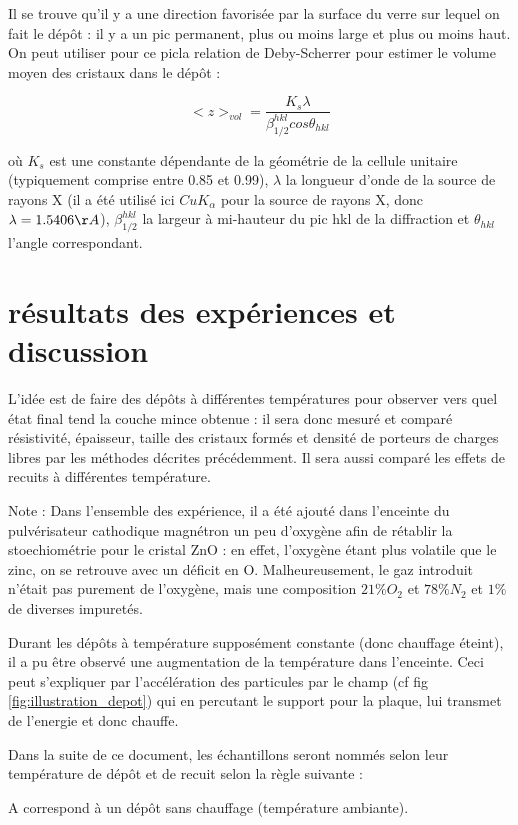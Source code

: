\documentclass[a4paper,12pt,oneside]{article}
\def \be {\begin{equation}}
\def \ee {\end{equation}}
\begin{document}
Il se trouve qu'il y a une direction favorisée par la surface du verre sur lequel on fait le dépôt : il y a un pic permanent, plus ou moins large et plus ou moins haut. On peut utiliser pour ce picla relation de Deby-Scherrer pour estimer le volume moyen des cristaux dans le dépôt :

\be
	<z>_{vol}=\frac{K_s\lambda}{\beta^{hkl}_{1/2} cos\theta_{hkl}}
\ee

où $K_s$ est une constante dépendante de la géométrie de la cellule unitaire (typiquement comprise entre 0.85 et 0.99), $\lambda$ la longueur d'onde de la source de rayons X (il a été utilisé ici $Cu K_{\alpha}$ pour la source de rayons X, donc $\lambda = 1.5406 \AA$), $\beta^{hkl}_{1/2}$ la largeur à mi-hauteur du pic hkl de la diffraction et $\theta_{hkl}$ l'angle correspondant.



\section{résultats des expériences et discussion}

L'idée est de faire des dépôts à différentes températures pour observer vers quel état final tend la couche mince obtenue : il sera donc mesuré et comparé résistivité, épaisseur, taille des cristaux formés et densité de porteurs de charges libres par les méthodes décrites précédemment. Il sera aussi comparé les effets de recuits à différentes température.

Note : Dans l'ensemble des expérience, il a été ajouté dans l'enceinte du pulvérisateur cathodique magnétron un peu d'oxygène afin de rétablir la stoechiométrie pour le cristal ZnO : en effet, l'oxygène étant plus volatile que le zinc, on se retrouve avec un déficit en O. Malheureusement, le gaz introduit n'était pas purement de l'oxygène, mais une composition $21 \% O_2 $ et $78 \% N_2 $ et $1 \% $ de diverses impuretés.

Durant les dépôts à température supposément constante (donc chauffage éteint), il a pu être observé une augmentation de la température dans l'enceinte. Ceci peut s'expliquer par l'accélération des particules par le champ (cf fig \ref{fig:illustration_depot}) qui en percutant le support pour la plaque, lui transmet de l'energie et donc chauffe.

Dans la suite de ce document, les échantillons seront nommés selon leur température de dépôt et de recuit selon la règle suivante :

A correspond à un dépôt sans chauffage (température ambiante).
\end{document}
